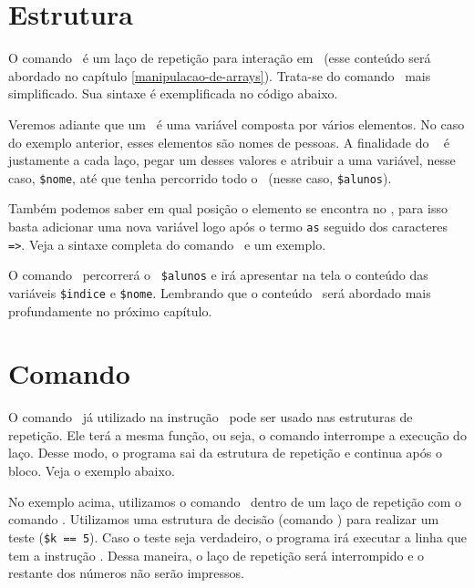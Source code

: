 \section{Estrutura \comandoforeach}
\label{estrutura-foreach}

O comando \comandoforeach~é um laço de repetição para interação em 
\tipoarray~(esse conteúdo será abordado no capítulo \ref{manipulacao-de-arrays}).
Trata-se do comando \comandofor~mais simplificado. Sua sintaxe é exemplificada no código abaixo.



Veremos adiante que um \tipoarray~é uma variável composta por vários elementos. No caso do 
exemplo anterior, esses elementos são nomes de pessoas. A finalidade do \comandoforeach~
é justamente a cada laço, pegar um desses valores e atribuir a uma variável, nesse caso, 
\texttt{\$nome}, até que tenha percorrido todo o \tipoarray~(nesse caso, \texttt{\$alunos}).

Também podemos saber em qual posição o elemento se encontra no \tipoarray, para isso basta 
adicionar uma nova variável logo após o termo \texttt{as} seguido dos caracteres \texttt{=>}.
Veja a sintaxe completa do comando \comandoforeach~e um exemplo.



O comando \comandoforeach~percorrerá o \tipoarray~\texttt{\$alunos} e irá apresentar
na tela o conteúdo das variáveis \texttt{\$indice} e \texttt{\$nome}. Lembrando que o
conteúdo \tipoarray~será abordado mais profundamente no próximo capítulo.

\section{Comando \comandobreak}
\label{comando-break}

O comando \comandobreak~já utilizado na instrução \comandoswitch~pode ser usado nas 
estruturas de repetição. Ele terá a mesma função, ou seja, o comando interrompe a 
execução do laço. Desse modo, o programa sai da estrutura de repetição e continua 
após o bloco. Veja o exemplo abaixo.



No exemplo acima, utilizamos o comando \comandobreak~dentro de um laço de repetição com
o comando \comandofor. Utilizamos uma estrutura de decisão (comando \comandoif) para
realizar um teste (\texttt{\$k == 5}). Caso o teste seja verdadeiro, o programa
irá executar a linha que tem a instrução \comandobreak. Dessa maneira, o laço de 
repetição será interrompido e o restante dos números não serão impressos.

